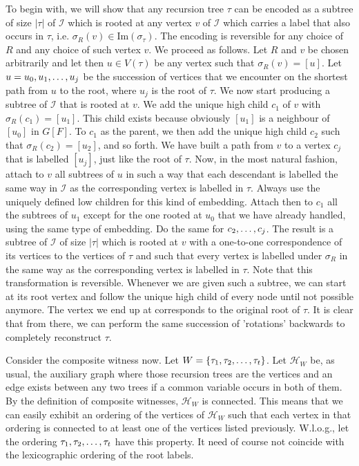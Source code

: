 \documentclass[11pt,a4paper]{article}
\begin{document}
To begin with, we will show that any recursion tree $\tau$ can be encoded as a subtree of size $|\tau|$ of $\mathcal{I}$
which is rooted at any vertex $v$ of $\mathcal{I}$ which carries a label that also occurs in $\tau$, i.e. $\sigma_R(v) \in \mbox{Im}(\sigma_\tau)$.
The encoding is reversible for any choice of $R$ and any choice of such vertex $v$. We proceed as follows. Let $R$ and $v$
be chosen arbitrarily and let then $u \in V(\tau)$ be any vertex such that $\sigma_R(v) = [u]$. Let $u=u_0, u_1, \mathellipsis, u_j$ be the
succession of vertices that we encounter on the shortest path from $u$ to the root, where $u_j$ is the root of $\tau$. We now start
producing a subtree of $\mathcal{I}$ that is rooted at $v$. We add the unique high child $c_1$ of $v$ with $\sigma_R(c_1)=[u_1]$.
This child exists because obviously $[u_1]$ is a neighbour of $[u_0]$ in $G[F]$. To $c_1$ as the parent, we then add the unique
high child $c_2$ such that $\sigma_R(c_2)=[u_2]$, and so forth. We have built a path from $v$ to a vertex $c_j$ that
is labelled $[u_j]$, just like the root of $\tau$. Now, in the most natural fashion, attach to $v$ all subtrees of $u$ in such
a way that each descendant is labelled the same way in $\mathcal{I}$ as the corresponding vertex is labelled in $\tau$. Always
use the uniquely defined low children for this kind of embedding. Attach then to $c_1$ all the subtrees of $u_1$ except for
the one rooted at $u_0$ that we have already handled, using the same type of embedding. Do the same for $c_2, \mathellipsis, c_j$.
The result is a subtree of $\mathcal{I}$ of size $|\tau|$ which is rooted at $v$ with a one-to-one correspondence of its vertices
to the vertices of $\tau$ and such that every vertex is labelled under $\sigma_R$ in the same way as the corresponding vertex is
labelled in $\tau$. Note that this transformation is reversible. Whenever we are given such a subtree, we can start at its root
vertex and follow the unique high child of every node until not possible anymore. The vertex we end up at corresponds to the
original root of $\tau$. It is clear that from there, we can perform the same succession of 'rotations' backwards to completely 
reconstruct $\tau$.

Consider the composite witness now. Let $W = \{\tau_1, \tau_2, \mathellipsis, \tau_t\}$. 
Let $\mathcal{H}_W$ be, as usual, the auxiliary graph where those recursion
trees are the vertices and an edge exists between any two trees if a common variable occurs in both of them. By the definition of
composite witnesses, $\mathcal{H}_W$ is connected. This means that we can easily exhibit an ordering of the vertices of $\mathcal{H}_W$
such that each vertex in that ordering is connected to at least one of the vertices listed previously. W.l.o.g., let the ordering
$\tau_1, \tau_2, \mathellipsis, \tau_t$ have this property. It need of course not coincide with the lexicographic ordering of the
root labels.
\end{document}
